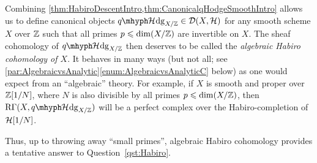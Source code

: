 \documentclass[DIV=12,numbers=enddot,leqno,bibliography=totoc]{scrartcl}
\begin{document}
	\begin{numpar}\label{par:AlgebraicHabiroCohomology}
		Combining \cref{thm:HabiroDescentIntro,thm:CanonicalqHodgeSmoothIntro} allows us to define canonical objects $\qHhodge_{X/\IZ}\in\Dd(X,\Hh)$ for any smooth scheme $X$ over $\mathbb{Z}$ such that all primes $p\leqslant \dim(X/\mathbb{Z})$ are invertible on $X$. The sheaf cohomology of $\qHhodge_{X/\IZ}$ then deserves to be called the \emph{algebraic Habiro cohomology of $X$}. It behaves in many ways (but not all; see \cref{par:AlgebraicvsAnalytic}\cref{enum:AlgebraicvsAnalyticC} below) as one would expect from an \enquote{algebraic} theory. For example, if $X$ is smooth and proper over $\mathbb{Z}[1/N]$, where $N$ is also divisible by all primes $p\leqslant \dim(X/\mathbb{Z})$, then $\R\Gamma(X,\qHhodge_{X/\IZ})$ will be a perfect complex over the Habiro-completion of $\mathcal{H}[1/N]$.
		
		Thus, up to throwing away \enquote{small primes}, algebraic Habiro cohomology provides a tentative answer to Question~\cref{qst:Habiro}.
	\end{numpar}
\end{document}
